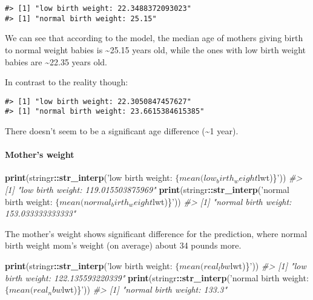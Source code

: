 \documentclass[]{article}
\newenvironment{Shaded}{\begin{snugshade}}{\end{snugshade}}
\newcommand{\CommentTok}[1]{\textcolor[rgb]{0.56,0.35,0.01}{\textit{#1}}}
\newcommand{\KeywordTok}[1]{\textcolor[rgb]{0.13,0.29,0.53}{\textbf{#1}}}
\newcommand{\NormalTok}[1]{#1}
\newcommand{\OperatorTok}[1]{\textcolor[rgb]{0.81,0.36,0.00}{\textbf{#1}}}
\newcommand{\StringTok}[1]{\textcolor[rgb]{0.31,0.60,0.02}{#1}}
\let\oldparagraph\paragraph
\renewcommand{\paragraph}[1]{\oldparagraph{#1}\mbox{}}
\begin{document}
\begin{verbatim}
#> [1] "low birth weight: 22.3488372093023"
#> [1] "normal birth weight: 25.15"
\end{verbatim}

We can see that according to the model, the median age of mothers giving
birth to normal weight babies is \textasciitilde{}25.15 years old, while
the ones with low birth weight babies are \textasciitilde{}22.35 years
old.

In contrast to the reality though:

\begin{verbatim}
#> [1] "low birth weight: 22.3050847457627"
#> [1] "normal birth weight: 23.6615384615385"
\end{verbatim}

There doesn't seem to be a significant age difference
(\textasciitilde{}1 year).

\hypertarget{mothers-weight}{%
\paragraph{Mother's weight}\label{mothers-weight}}

\begin{Shaded}
\begin{Highlighting}[]
\KeywordTok{print}\NormalTok{(stringr}\OperatorTok{::}\KeywordTok{str_interp}\NormalTok{(}\StringTok{'low birth weight: $\{mean(low_birth_weight$lwt)\}'}\NormalTok{))}
\CommentTok{#> [1] "low birth weight: 119.015503875969"}
\KeywordTok{print}\NormalTok{(stringr}\OperatorTok{::}\KeywordTok{str_interp}\NormalTok{(}\StringTok{'normal birth weight: $\{mean(normal_birth_weight$lwt)\}'}\NormalTok{))}
\CommentTok{#> [1] "normal birth weight: 153.033333333333"}
\end{Highlighting}
\end{Shaded}

The mother's weight shows significant difference for the prediction,
where normal birth weight mom's weight (on average) about 34 pounds
more.

\begin{Shaded}
\begin{Highlighting}[]
\KeywordTok{print}\NormalTok{(stringr}\OperatorTok{::}\KeywordTok{str_interp}\NormalTok{(}\StringTok{'low birth weight: $\{mean(real_lbw$lwt)\}'}\NormalTok{))}
\CommentTok{#> [1] "low birth weight: 122.135593220339"}
\KeywordTok{print}\NormalTok{(stringr}\OperatorTok{::}\KeywordTok{str_interp}\NormalTok{(}\StringTok{'normal birth weight: $\{mean(real_nbw$lwt)\}'}\NormalTok{))}
\CommentTok{#> [1] "normal birth weight: 133.3"}
\end{Highlighting}
\end{Shaded}
\end{document}
